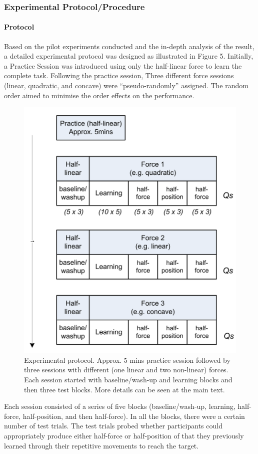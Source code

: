 \subsubsection{Experimental Protocol/Procedure}

\paragraph{Protocol}
Based on the pilot experiments conducted and the in-depth analysis of the result, a detailed experimental protocol was designed as illustrated in Figure 5. Initially, a Practice Session was introduced using only the half-linear force to learn the complete task. Following the practice session, Three different force sessions (linear, quadratic, and concave) were “pseudo-randomly” assigned. The random order aimed to minimise the order effects on the performance.
\begin{figure}
	\centering
	\includegraphics[width=.7\textwidth]{Chie/figs/Figure5.png}
	\caption{Experimental protocol. Approx. 5 mins practice session followed by three sessions with different (one linear and two non-linear) forces. Each session started with baseline/wash-up and learning blocks and then three test blocks. More details can be seen at the main text.}
	\label{protocol}
\end{figure}
Each session consisted of a series of five blocks (baseline/wash-up, learning, half-force, half-position, and then half-force). In all the blocks, there were a certain number of test trials. The test trials probed whether participants could appropriately produce either half-force or half-position of that they previously learned through their repetitive movements to reach the target.

